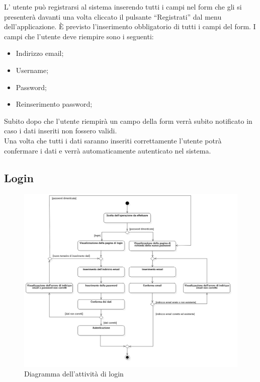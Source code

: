 L' utente può registrarsi al sistema inserendo tutti i campi nel form che gli si presenterà davanti una volta cliccato il pulsante ``Registrati'' dal menu dell'applicazione. È previsto l'inserimento obbligatorio di tutti i campi del form.
I campi che l'utente deve riempire sono i seguenti:
\begin{itemize}
	\item Indirizzo email;
	\item Username;
	\item Password;
	\item Reinserimento password;
\end{itemize}
Subito dopo che l'utente riempirà un campo della form verrà subito notificato in caso i dati inseriti non fossero validi. \\
Una volta che tutti i dati saranno inseriti correttamente l'utente potrà confermare i dati e verrà automaticamente autenticato nel sistema.

\newpage

\subsection{Login}

\begin{figure}[!h]
	\centering
	\includegraphics[scale=0.4]{img/attivita/login}  
	\caption{Diagramma dell'attività di login}
\end{figure}

